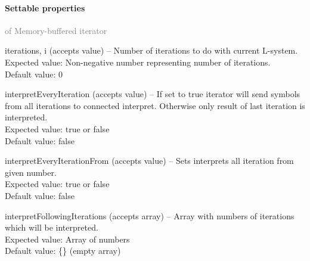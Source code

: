 	\paragraph{Settable properties}\textcolor{gray}{of Memory-buffered iterator}
	\begin{description*}
		\item[iterations, i]
		(accepts value)
			-- Number of iterations to do with current L-system.
			\\ Expected value: Non-negative number representing number of iterations.
			\\ Default value: 0
		\item[interpretEveryIteration]
		(accepts value)
			-- If set to true iterator will send symbols from all iterations to connected interpret.
            Otherwise only result of last iteration is interpreted.
			\\ Expected value: true or false
			\\ Default value: false
		\item[interpretEveryIterationFrom]
		(accepts value)
			-- Sets interprets all iteration from given number.
			\\ Expected value: true or false
			\\ Default value: false
		\item[interpretFollowingIterations]
		(accepts array)
			-- Array with numbers of iterations which will be interpreted.
			\\ Expected value: Array of numbers
			\\ Default value: \{\} (empty array)
	\end{description*}
